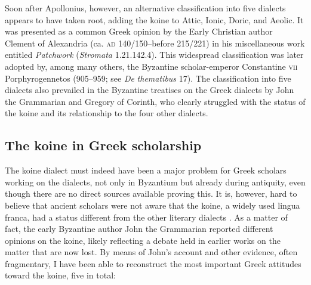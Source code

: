 \documentclass[output=paper]{langsci/langscibook}
\begin{document}
Soon after Apollonius, however, an alternative classification into five dialects appears to have taken root, adding the koine to Attic, Ionic, Doric, and Aeolic. It was presented as a common Greek opinion by the Early Christian author Clement of Alexandria (ca. \textsc{ad} 140/150–before 215/221) in his miscellaneous work entitled \textit{Patchwork} (\textit{Stromata} 1.21.142.4). This widespread classification was later adopted by, among many others, the Byzantine scholar-emperor Constantine \textsc{vii} Porphyrogennetos (905–959; see \textit{De} \textit{thematibus} 17). The classification into five dialects also prevailed in the Byzantine treatises on the Greek dialects by John the Grammarian and Gregory of Corinth, who clearly struggled with the status of the koine and its relationship to the four other dialects.

\subsection{The koine in Greek scholarship}
\hypertarget{Toc19704809}{}
The koine dialect must indeed have been a major problem for Greek scholars working on the dialects, not only in Byzantium but already during antiquity, even though there are no direct sources available proving this. It is, however, hard to believe that ancient scholars were not aware that the koine, a widely used lingua franca, had a status different from the other literary dialects \citep{Consani2000}. As a matter of fact, the early Byzantine author John the Grammarian reported different opinions on the koine, likely reflecting a debate held in earlier works on the matter that are now lost. By means of John’s account and other evidence, often fragmentary, I have been able to reconstruct the most important Greek attitudes toward the koine, five in total:
\end{document}

